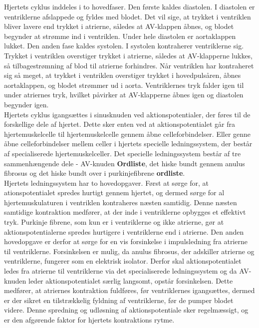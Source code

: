 Hjertets cyklus inddeles i to hovedfaser. Den første kaldes diastolen. I diastolen er ventriklerne afslappede og fyldes med blodet. Det vil sige, at trykket i ventriklen bliver lavere end trykket i atrierne, således at AV-klappen åbnes, og blodet begynder at strømme ind i ventriklen. Under hele diastolen er aortaklappen lukket. Den anden fase kaldes systolen. I systolen kontraherer ventriklerne sig. Trykket i ventriklen overstiger trykket i atrierne, således at AV-klapperne lukkes, så tilbagestrømning af blod til atrierne forhindres. Når ventriklen har kontraheret sig så meget, at trykket i ventriklen overstiger trykket i hovedpulsåren, åbnes aortaklappen, og blodet strømmer ud i aorta. Ventriklernes tryk falder igen til under atriernes tryk, hvilket påvirker at AV-klapperne åbnes igen og diastolen begynder igen.\\
Hjertets cyklus igangsættes i sinusknuden ved aktionspotentialer, der føres til de forskellige dele af hjertet. Dette sker enten ved at aktionspotentialet går fra hjertemuskelcelle til hjertemuskelcelle gennem åbne celleforbindelser. Eller genne åbne celleforbindelser mellem celler i hjertets specielle ledningssystem, der består af specialiserede hjertemuskelceller. Det specielle ledningssystem består af tre sammenhængende dele - AV-knuden \textbf{ Ordliste}, det hiske bundt gennem anulus fibrosus og det hiske bundt over i purkinjefibrene \textbf{ ordliste}. \\
Hjertets ledningssystem har to hovedopgaver. Først at sørge for, at ationspotentialet spredes hurtigt gennem hjertet, og dermed sørge for al hjertemuskulaturen i ventriklen kontraheres næsten samtidig. Denne næsten samtidige kontraktion medfører, at der inde i ventriklerne opbygges et effektivt tryk. Purkinje fibrene, som kun er i ventriklerne og ikke atrierne, gør at aktionspotentialerne spredes hurtigere i ventriklerne end i atrierne. Den anden hovedopgave er derfor at sørge for en vis forsinkelse i impulsledning fra atrierne til ventriklerne. Forsinkelsen er mulig, da anulus fibrosus, der adskiller atrierne og ventriklerne, fungerer som en elektrisk isolator. Derfor skal aktionspotentialet ledes fra atrierne til ventriklerne via det specialiserede ledningssystem og da AV-knuden leder aktionspotentialet særlig langsomt, opstår forsinkelsen. Dette medfører, at atriernes kontraktion fuldføres, før ventriklernes igangsættes, dermed er der sikret en tilstrækkelig fyldning af ventriklerne, før de pumper blodet videre. Denne spredning og udløsning af aktionspotentiale sker regelmæssigt, og er den afgørende faktor for hjertets kontraktions rytme.
